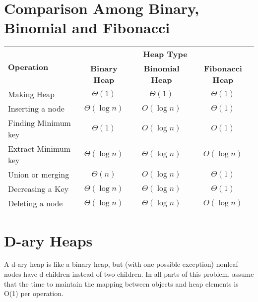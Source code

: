 \documentclass[a4paper,10pt]{article}
\begin{document}
\section{Comparison Among Binary, Binomial and Fibonacci}

\begin{table}[H]
    \raggedright
    \begin{tabular}{|l|c|c|c|}
    \hline
    \multirow{2}{*}{\textbf{Operation}} & \multicolumn{3}{c|}{\textbf{Heap Type}} \\ \cline{2-4}
                                      & \textbf{Binary Heap} & \textbf{Binomial Heap} & \textbf{Fibonacci Heap} \\ \hline
    Making Heap                     & $\Theta(1)$          & $\Theta(1)$            & $\Theta(1)$            \\ \hline
    Inserting a node                & $\Theta(\log n)$     & $O(\log n)$            & $\Theta(1)$            \\ \hline
    Finding Minimum key             & $\Theta(1)$          & $O(\log n)$            & $O(1)$                 \\ \hline
    Extract-Minimum key             & $\Theta(\log n)$     & $\Theta(\log n)$       & $O(\log n)$            \\ \hline
    Union or merging                & $\Theta(n)$          & $O(\log n)$            & $\Theta(1)$            \\ \hline
    Decreasing a Key                & $\Theta(\log n)$     & $\Theta(\log n)$       & $\Theta(1)$            \\ \hline
    Deleting a node                 & $\Theta(\log n)$     & $\Theta(\log n)$       & $O(\log n)$            \\ \hline
    \end{tabular}
\end{table}


\section{D-ary Heaps}
A d-ary heap is like a binary heap, but (with one possible exception)
nonleaf nodes have d children instead of two children. In all parts of
this problem, assume that the time to maintain the mapping between
objects and heap elements is O(1) per operation.
\end{document}
